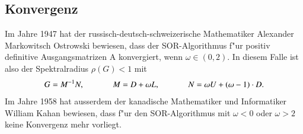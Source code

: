 \begin{refsection}
\section{Konvergenz} \label{sec: Konvergenz}
Im Jahre 1947 hat der russisch-deutsch-schweizerische Mathematiker
Alexander Markowitsch Ostrowski \cite{AlexanderMarkowitschOstrowski}
bewiesen, dass der SOR-Algorithmus f"ur positiv definitive
Ausgangsmatrizen A konvergiert, wenn $\omega \in (0,2)$. In diesem Falle
ist also der Spektralradius $\rho(G) < 1$ mit
\begin{equation} \label{Spektralradius}
G=M^{-1}N,\hspace{.1\textwidth}
M=D+\omega L,\hspace{.1\textwidth}
N=\omega U+(\omega-1)\cdot D.
\end{equation}
Im Jahre 1958 hat ausserdem der kanadische Mathematiker und Informatiker
William Kahan \cite{WilliamKahan} bewiesen, dass f"ur den SOR-Algorithmus
mit $\omega < 0$ oder $\omega > 2$ keine Konvergenz mehr vorliegt.

\nocite{Watkins:FundamentalsOfMatrixComputations, SOR_Dorn, Vorkonditionierung_Dorn,wikiEn_SOR, wikiDe_SOR, SSOR, AlexanderMarkowitschOstrowski, WilliamKahan}		
\printbibliography[heading=subbibliography]
\end{refsection}
